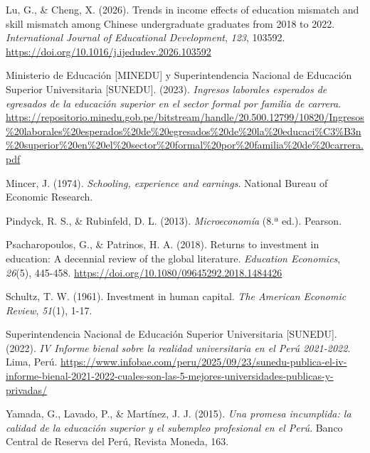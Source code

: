 \documentclass[11pt, a4paper]{article}
\begin{document}
\vspace{0.2cm}
\noindent\hangindent=1.27cm
Lu, G., \& Cheng, X. (2026). Trends in income effects of education mismatch and skill mismatch among Chinese undergraduate graduates from 2018 to 2022. \textit{International Journal of Educational Development}, \textit{123}, 103592. \url{https://doi.org/10.1016/j.ijedudev.2026.103592}

\vspace{0.2cm}
\noindent\hangindent=1.27cm
Ministerio de Educación [MINEDU] y Superintendencia Nacional de Educación Superior Universitaria [SUNEDU]. (2023). \textit{Ingresos laborales esperados de egresados de la educación superior en el sector formal por familia de carrera}. \url{https://repositorio.minedu.gob.pe/bitstream/handle/20.500.12799/10820/Ingresos\%20laborales\%20esperados\%20de\%20egresados\%20de\%20la\%20educaci\%C3\%B3n\%20superior\%20en\%20el\%20sector\%20formal\%20por\%20familia\%20de\%20carrera.pdf}

\vspace{0.2cm}
\noindent\hangindent=1.27cm
Mincer, J. (1974). \textit{Schooling, experience and earnings}. National Bureau of Economic Research.

\vspace{0.2cm}
\noindent\hangindent=1.27cm
Pindyck, R. S., \& Rubinfeld, D. L. (2013). \textit{Microeconomía} (8.ª ed.). Pearson.

\vspace{0.2cm}
\noindent\hangindent=1.27cm
Psacharopoulos, G., \& Patrinos, H. A. (2018). Returns to investment in education: A decennial review of the global literature. \textit{Education Economics}, \textit{26}(5), 445-458. \url{https://doi.org/10.1080/09645292.2018.1484426}

\vspace{0.2cm}
\noindent\hangindent=1.27cm
Schultz, T. W. (1961). Investment in human capital. \textit{The American Economic Review}, \textit{51}(1), 1-17.

\vspace{0.2cm}
\noindent\hangindent=1.27cm
Superintendencia Nacional de Educación Superior Universitaria [SUNEDU]. (2022). \textit{IV Informe bienal sobre la realidad universitaria en el Perú 2021-2022}. Lima, Perú. \url{https://www.infobae.com/peru/2025/09/23/sunedu-publica-el-iv-informe-bienal-2021-2022-cuales-son-las-5-mejores-universidades-publicas-y-privadas/}

\vspace{0.2cm}
\noindent\hangindent=1.27cm
Yamada, G., Lavado, P., \& Martínez, J. J. (2015). \textit{Una promesa incumplida: la calidad de la educación superior y el subempleo profesional en el Perú}. Banco Central de Reserva del Perú, Revista Moneda, 163.
\end{document}
